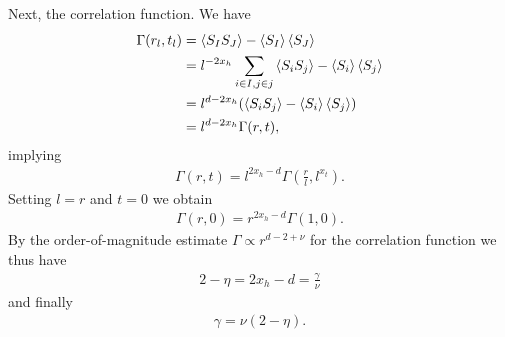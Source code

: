 Next, the correlation function. We have
\begin{align*}
	\Gamma(r_{l}, t_{l}) &= \expval{S_{I}S_{J}} -\expval{S_{I}}\expval{S_{J}} \\
	                     &= l^{-2x_{h}}\sum\limits_{i\in I, j\in j}\expval{S_{i}S_{j}} -\expval{S_{i}}\expval{S_{j}} \\
	                     &= l^{d - 2x_{h}}(\expval{S_{i}S_{j}} -\expval{S_{i}}\expval{S_{j}}) \\
	                     &= l^{d - 2x_{h}}\Gamma(r, t),
\end{align*}
implying
\begin{align*}
	\Gamma(r, t) = l^{2x_{h} - d}\Gamma\left(\frac{r}{l}, l^{x_{t}}\right).
\end{align*}
Setting $l = r$ and $t = 0$ we obtain
\begin{align*}
	\Gamma(r, 0) = r^{2x_{h} - d}\Gamma\left(1, 0\right).
\end{align*}
By the order-of-magnitude estimate $\Gamma\propto r^{d - 2 + \nu}$ for the correlation function we thus have
\begin{align*}
	2 - \eta = 2x_{h} - d = \frac{\gamma}{\nu}
\end{align*}
and finally
\begin{align*}
	\gamma = \nu(2 - \eta).
\end{align*}